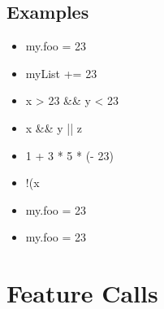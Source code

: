 \documentclass[a4paper,10pt]{scrreprt}
\newlength{\itemindentlen}
\begin{document}
 




\subsection{ Examples }


\setlength{\itemindentlen}{\textwidth}
\begin{itemize}
\addtolength{\itemindentlen}{-2em}

\item \begin{minipage}[t]{\itemindentlen}
my.foo = 23
\end{minipage}

\item \begin{minipage}[t]{\itemindentlen}
myList += 23
\end{minipage}

\item \begin{minipage}[t]{\itemindentlen}
x > 23 \&\& y < 23
\end{minipage}

\item \begin{minipage}[t]{\itemindentlen}
x \&\& y || z
\end{minipage}

\item \begin{minipage}[t]{\itemindentlen}
1 + 3 * 5 * (- 23)
\end{minipage}

\item \begin{minipage}[t]{\itemindentlen}
!(x
\end{minipage}

\item \begin{minipage}[t]{\itemindentlen}
my.foo = 23
\end{minipage}

\item \begin{minipage}[t]{\itemindentlen}
my.foo = 23
\end{minipage}

\end{itemize}
\addtolength{\itemindentlen}{2em}







\section{Feature Calls}
\label{FeatureCalls}
\end{document}
